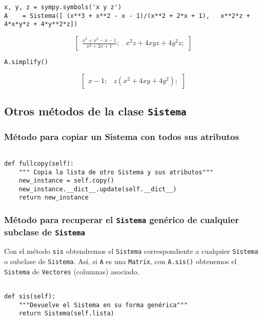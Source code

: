 \documentclass[11pt]{report}
\begin{document}
\begin{verbatim}
x, y, z = sympy.symbols('x y z')
A    = Sistema([ (x**3 + x**2 - x - 1)/(x**2 + 2*x + 1),   x**2*z + 4*x*y*z + 4*y**2*z])
\end{verbatim}

$$\left[ \begin{array}{cc}\frac{x^{3} + x^{2} - x - 1}{x^{2} + 2 x + 1};& x^{2} z + 4 x y z + 4 y^{2} z;\end{array} \right]$$

\begin{verbatim}
A.simplify()
\end{verbatim}

$$\left[ \begin{array}{cc}x - 1;& z \left(x^{2} + 4 x y + 4 y^{2}\right);\end{array} \right]$$

\subsection{Otros métodos de la clase \texttt{Sistema}}
\label{sec:org14adcea}
\subsubsection{Método para copiar un Sistema con todos sus atributos}
\label{sec:org6a210c6}

\begin{verbatim}

def fullcopy(self):
    """ Copia la lista de otro Sistema y sus atributos"""
    new_instance = self.copy()
    new_instance.__dict__.update(self.__dict__)
    return new_instance

\end{verbatim}

\subsubsection{Método para recuperar el \texttt{Sistema} genérico de cualquier subclase de \texttt{Sistema}}
\label{sec:org9c0a14b}

Con el método \texttt{sis} obtendremos el \texttt{Sistema} correspondiente a
cualquier \texttt{Sistema} o subclase de \texttt{Sistema}. Así, si \texttt{A} es una
\texttt{Matrix}, con \texttt{A.sis()} obtenemos el \texttt{Sistema} de \texttt{Vectores}
(columnas) asociado.
\begin{verbatim}

def sis(self):
    """Devuelve el Sistema en su forma genérica"""
    return Sistema(self.lista)

\end{verbatim}
\end{document}

